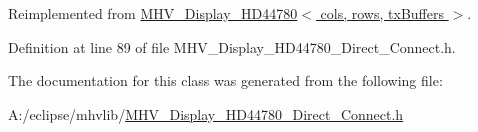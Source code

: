 Reimplemented from \hyperlink{class_m_h_v___display___h_d44780_a447c8849122f3533367daf1b105cf9c1}{M\-H\-V\-\_\-\-Display\-\_\-\-H\-D44780$<$ cols, rows, tx\-Buffers $>$}.



Definition at line 89 of file M\-H\-V\-\_\-\-Display\-\_\-\-H\-D44780\-\_\-\-Direct\-\_\-\-Connect.\-h.



The documentation for this class was generated from the following file\-:\begin{DoxyCompactItemize}
\item 
A\-:/eclipse/mhvlib/\hyperlink{_m_h_v___display___h_d44780___direct___connect_8h}{M\-H\-V\-\_\-\-Display\-\_\-\-H\-D44780\-\_\-\-Direct\-\_\-\-Connect.\-h}\end{DoxyCompactItemize}
